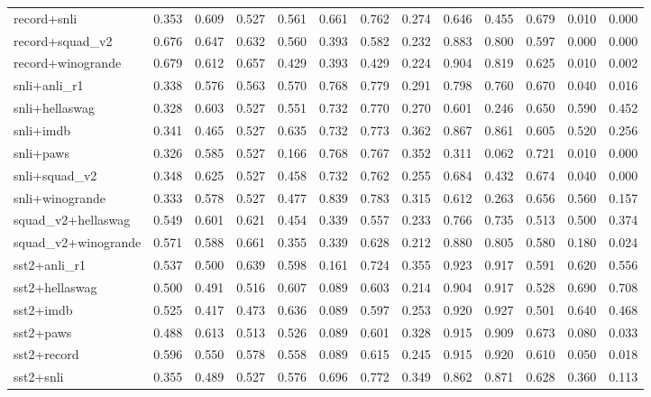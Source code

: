\begin{table}[t]
\begin{tabular}{lrrrrrrrrrrrr}
    record+snli & 0.353 & 0.609 & 0.527 & 0.561 & 0.661 & 0.762 & 0.274 & 0.646 & 0.455 & 0.679 & 0.010 & 0.000 \\
    record+squad\_v2 & 0.676 & 0.647 & 0.632 & 0.560 & 0.393 & 0.582 & 0.232 & 0.883 & 0.800 & 0.597 & 0.000 & 0.000 \\
    record+winogrande & 0.679 & 0.612 & 0.657 & 0.429 & 0.393 & 0.429 & 0.224 & 0.904 & 0.819 & 0.625 & 0.010 & 0.002 \\
    snli+anli\_r1 & 0.338 & 0.576 & 0.563 & 0.570 & 0.768 & 0.779 & 0.291 & 0.798 & 0.760 & 0.670 & 0.040 & 0.016 \\
    snli+hellaswag & 0.328 & 0.603 & 0.527 & 0.551 & 0.732 & 0.770 & 0.270 & 0.601 & 0.246 & 0.650 & 0.590 & 0.452 \\
    snli+imdb & 0.341 & 0.465 & 0.527 & 0.635 & 0.732 & 0.773 & 0.362 & 0.867 & 0.861 & 0.605 & 0.520 & 0.256 \\
    snli+paws & 0.326 & 0.585 & 0.527 & 0.166 & 0.768 & 0.767 & 0.352 & 0.311 & 0.062 & 0.721 & 0.010 & 0.000 \\
    snli+squad\_v2 & 0.348 & 0.625 & 0.527 & 0.458 & 0.732 & 0.762 & 0.255 & 0.684 & 0.432 & 0.674 & 0.040 & 0.000 \\
    snli+winogrande & 0.333 & 0.578 & 0.527 & 0.477 & 0.839 & 0.783 & 0.315 & 0.612 & 0.263 & 0.656 & 0.560 & 0.157 \\
    squad\_v2+hellaswag & 0.549 & 0.601 & 0.621 & 0.454 & 0.339 & 0.557 & 0.233 & 0.766 & 0.735 & 0.513 & 0.500 & 0.374 \\
    squad\_v2+winogrande & 0.571 & 0.588 & 0.661 & 0.355 & 0.339 & 0.628 & 0.212 & 0.880 & 0.805 & 0.580 & 0.180 & 0.024 \\
    sst2+anli\_r1 & 0.537 & 0.500 & 0.639 & 0.598 & 0.161 & 0.724 & 0.355 & 0.923 & 0.917 & 0.591 & 0.620 & 0.556 \\
    sst2+hellaswag & 0.500 & 0.491 & 0.516 & 0.607 & 0.089 & 0.603 & 0.214 & 0.904 & 0.917 & 0.528 & 0.690 & 0.708 \\
    sst2+imdb & 0.525 & 0.417 & 0.473 & 0.636 & 0.089 & 0.597 & 0.253 & 0.920 & 0.927 & 0.501 & 0.640 & 0.468 \\
    sst2+paws & 0.488 & 0.613 & 0.513 & 0.526 & 0.089 & 0.601 & 0.328 & 0.915 & 0.909 & 0.673 & 0.080 & 0.033 \\
    sst2+record & 0.596 & 0.550 & 0.578 & 0.558 & 0.089 & 0.615 & 0.245 & 0.915 & 0.920 & 0.610 & 0.050 & 0.018 \\
    sst2+snli & 0.355 & 0.489 & 0.527 & 0.576 & 0.696 & 0.772 & 0.349 & 0.862 & 0.871 & 0.628 & 0.360 & 0.113 \\

\end{tabular}
\end{table}
